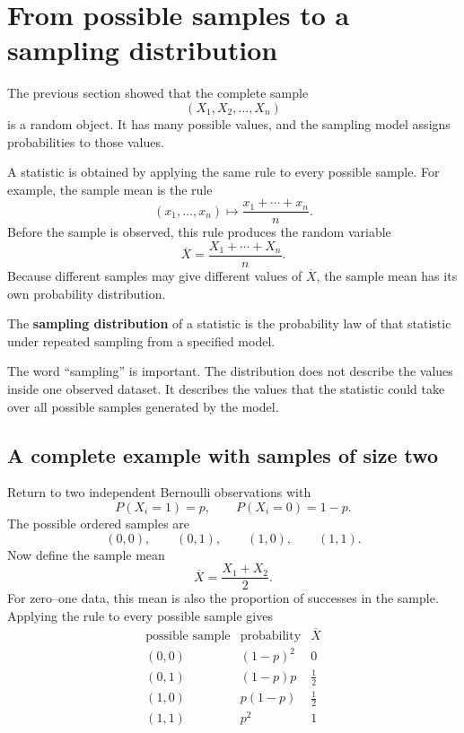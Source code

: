 \section{From possible samples to a sampling distribution}

The previous section showed that the complete sample
\[
(X_1,X_2,\ldots,X_n)
\]
is a random object. It has many possible values, and the sampling model assigns
probabilities to those values.

A statistic is obtained by applying the same rule to every possible sample. For
example, the sample mean is the rule
\[
(x_1,\ldots,x_n)
\longmapsto
\frac{x_1+\cdots+x_n}{n}.
\]
Before the sample is observed, this rule produces the random variable
\[
\overline X=\frac{X_1+\cdots+X_n}{n}.
\]
Because different samples may give different values of \(\overline X\), the
sample mean has its own probability distribution.

\begin{definitionbox}
The \textbf{sampling distribution} of a statistic is the probability law of that
statistic under repeated sampling from a specified model.
\end{definitionbox}

The word ``sampling'' is important. The distribution does not describe the
values inside one observed dataset. It describes the values that the statistic
could take over all possible samples generated by the model.

\subsection*{A complete example with samples of size two}

Return to two independent Bernoulli observations with
\[
P(X_i=1)=p,
\qquad
P(X_i=0)=1-p.
\]
The possible ordered samples are
\[
(0,0),\qquad(0,1),\qquad(1,0),\qquad(1,1).
\]
Now define the sample mean
\[
\overline X=\frac{X_1+X_2}{2}.
\]
For zero--one data, this mean is also the proportion of successes in the sample.
Applying the rule to every possible sample gives
\[
\begin{array}{c|c|c}
\text{possible sample} & \text{probability} & \overline X \\
\hline
(0,0) & (1-p)^2 & 0 \\
(0,1) & (1-p)p & \frac12 \\
(1,0) & p(1-p) & \frac12 \\
(1,1) & p^2 & 1
\end{array}
\]

